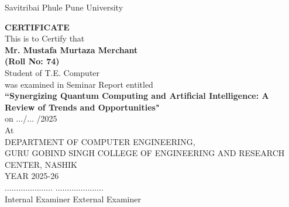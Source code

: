 	\thisfancypage{\setlength{\fboxsep}{10pt}\doublebox}{}	
		\vspace{4in}
		\begin{titlepage}				
		\begin{center}	
		{\small Savitribai Phule Pune University}\\
		\begin{figure*}[h]
		\centerline{}
		\label{atcres}
		\end{figure*}
		{\large \textbf{CERTIFICATE}}\\
		\vspace{0.2in}
		{\small This is to Certify that}\\
		\vspace{0.2in}
		{\bf Mr. Mustafa Murtaza Merchant} \hspace{0.1in} \\{\bf (Roll No: 74)}\\
		
		\vspace{0.2in}
		{\small Student of T.E. Computer}\\
		{\small was examined in Seminar Report entitled}\\
		\vspace{0.4in}
		{\Large \bf {``Synergizing Quantum Computing and Artificial Intelligence: A Review of Trends and Opportunities"}}\\
		\vspace{0.4in}
		{on $\ldots$/$\ldots$ /2025}\\
		\vspace{0.3in}
		{At}\\
		{ DEPARTMENT OF COMPUTER ENGINEERING,}\\
		{ GURU GOBIND SINGH COLLEGE OF ENGINEERING AND RESEARCH CENTER, NASHIK}\\
		{YEAR 2025-26}\\
		\vspace{0.6in}
		\noindent
		\hspace*{0.3in}$\ldots\ldots\ldots\ldots\ldots\ldots\ldots $\hspace{1.9in} $\ldots\ldots\ldots\ldots\ldots\ldots\ldots $\\
		\hspace*{0.3in} Internal Examiner \hspace*{2.2in} External Examiner\\
		
		\vspace{0.3in}
		\end{center}
	\end{titlepage}